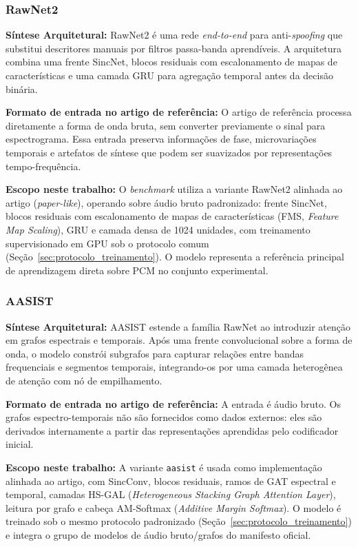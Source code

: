 \documentclass[12pt,a4paper]{article}
\begin{document}
\subsubsection[RawNet2]{RawNet2~\cite{tak2021rawnet2}}
\textbf{Síntese Arquitetural:} RawNet2 é uma rede \textit{end-to-end} para
anti-\textit{spoofing} que substitui descritores manuais por filtros
passa-banda aprendíveis. A arquitetura combina uma frente SincNet, blocos
residuais com escalonamento de mapas de características e uma camada GRU para
agregação temporal antes da decisão binária.

\par\textbf{Formato de entrada no artigo de referência:} O artigo de referência
processa diretamente a forma de onda bruta, sem converter previamente o sinal
para espectrograma. Essa entrada preserva informações de fase, microvariações
temporais e artefatos de síntese que podem ser suavizados por representações
tempo-frequência.

\par\textbf{Escopo neste trabalho:} O \textit{benchmark} utiliza a variante RawNet2
alinhada ao artigo (\textit{paper-like}), operando sobre áudio bruto
padronizado: frente SincNet, blocos residuais com escalonamento de mapas de
características (FMS, \textit{Feature Map Scaling}), GRU e camada densa de
\num{1024} unidades, com treinamento supervisionado em GPU sob o protocolo
comum (Seção~\ref{sec:protocolo_treinamento}). O modelo representa a
referência principal de aprendizagem direta sobre PCM no conjunto
experimental.

\subsubsection[AASIST]{AASIST~\cite{jung2022aasist}}
\textbf{Síntese Arquitetural:} AASIST estende a família RawNet ao introduzir
atenção em grafos espectrais e temporais. Após uma frente convolucional sobre a
forma de onda, o modelo constrói subgrafos para capturar relações entre bandas
frequenciais e segmentos temporais, integrando-os por uma camada heterogênea de
atenção com nó de empilhamento.

\par\textbf{Formato de entrada no artigo de referência:} A entrada é áudio
bruto. Os grafos espectro-temporais não são fornecidos como dados externos:
eles são derivados internamente a partir das representações aprendidas pelo
codificador inicial.

\par\textbf{Escopo neste trabalho:} A variante \texttt{aasist} é usada como
implementação alinhada ao artigo, com SincConv, blocos residuais, ramos de GAT
espectral e temporal, camadas HS-GAL (\textit{Heterogeneous Stacking Graph
	Attention Layer}), leitura por grafo e cabeça AM-Softmax (\textit{Additive
	Margin Softmax}). O modelo é treinado sob o mesmo protocolo padronizado
(Seção~\ref{sec:protocolo_treinamento}) e integra o grupo de modelos de áudio
bruto/grafos do manifesto oficial.
\end{document}
